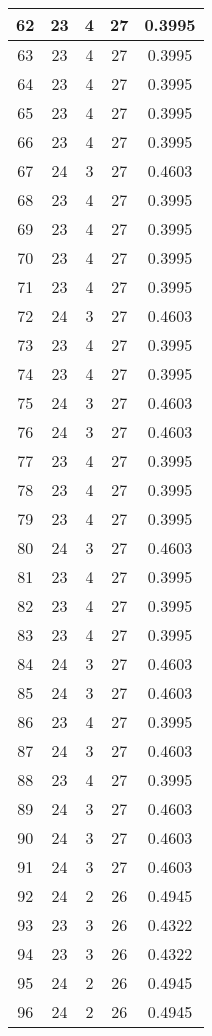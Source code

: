 \documentclass[letterpaper, 12pt]{article}
\begin{document}
\begin{longtable}{|c|c|c|c|c|}
\hline
62 & 23 & 4 & 27 & 0.3995 \\
\hline
63 & 23 & 4 & 27 & 0.3995 \\
\hline
64 & 23 & 4 & 27 & 0.3995 \\
\hline
65 & 23 & 4 & 27 & 0.3995 \\
\hline
66 & 23 & 4 & 27 & 0.3995 \\
\hline
67 & 24 & 3 & 27 & 0.4603 \\
\hline
68 & 23 & 4 & 27 & 0.3995 \\
\hline
69 & 23 & 4 & 27 & 0.3995 \\
\hline
70 & 23 & 4 & 27 & 0.3995 \\
\hline
71 & 23 & 4 & 27 & 0.3995 \\
\hline
72 & 24 & 3 & 27 & 0.4603 \\
\hline
73 & 23 & 4 & 27 & 0.3995 \\
\hline
74 & 23 & 4 & 27 & 0.3995 \\
\hline
75 & 24 & 3 & 27 & 0.4603 \\
\hline
76 & 24 & 3 & 27 & 0.4603 \\
\hline
77 & 23 & 4 & 27 & 0.3995 \\
\hline
78 & 23 & 4 & 27 & 0.3995 \\
\hline
79 & 23 & 4 & 27 & 0.3995 \\
\hline
80 & 24 & 3 & 27 & 0.4603 \\
\hline
81 & 23 & 4 & 27 & 0.3995 \\
\hline
82 & 23 & 4 & 27 & 0.3995 \\
\hline
83 & 23 & 4 & 27 & 0.3995 \\
\hline
84 & 24 & 3 & 27 & 0.4603 \\
\hline
85 & 24 & 3 & 27 & 0.4603 \\
\hline
86 & 23 & 4 & 27 & 0.3995 \\
\hline
87 & 24 & 3 & 27 & 0.4603 \\
\hline
88 & 23 & 4 & 27 & 0.3995 \\
\hline
89 & 24 & 3 & 27 & 0.4603 \\
\hline
90 & 24 & 3 & 27 & 0.4603 \\
\hline
91 & 24 & 3 & 27 & 0.4603 \\
\hline
92 & 24 & 2 & 26 & 0.4945 \\
\hline
93 & 23 & 3 & 26 & 0.4322 \\
\hline
94 & 23 & 3 & 26 & 0.4322 \\
\hline
95 & 24 & 2 & 26 & 0.4945 \\
\hline
96 & 24 & 2 & 26 & 0.4945 \\

\end{longtable}
\end{document}
